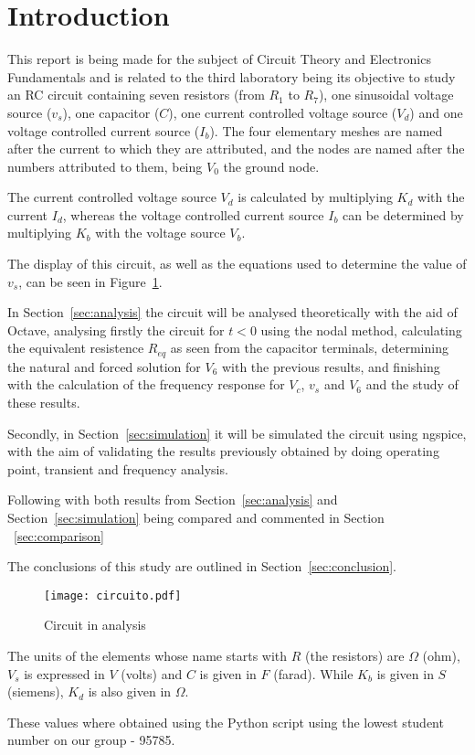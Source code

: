 \section{Introduction}
\label{sec:introduction}


\hspace{0,5cm} This report is being made for the subject of Circuit Theory and Electronics Fundamentals and is related to the third laboratory being its objective to study an RC circuit containing seven resistors (from $R_1$ to $R_7$), one sinusoidal voltage source ($v_s$), one capacitor ($C$), one current controlled voltage source ($V_d$) and one voltage controlled current source ($I_b$). The four elementary meshes are named after the current to which they are attributed, and the nodes are named after the numbers attributed to them, being $V_0$ the ground node.

The current controlled voltage source $V_d$ is calculated by multiplying $K_d$ with the current $I_d$, whereas the voltage controlled current source $I_b$ can be determined by multiplying $K_b$ with the voltage source $V_b$.

The display of this circuit, as well as the equations used to determine the value of $v_s$, can be seen in Figure~\ref{fig:circuito}.

In Section~\ref{sec:analysis} the circuit will be analysed theoretically with the aid of Octave, analysing firstly the circuit for $t<0$ using the nodal method, calculating the equivalent resistence $R_{eq}$ as seen from the capacitor terminals, determining the natural and forced solution for $V_6$ with the previous results, and finishing with the calculation of the frequency response for $V_c$, $v_s$ and $V_6$ and the study of these results.

Secondly, in Section~\ref{sec:simulation} it will be simulated the circuit using ngspice, with the aim of validating the results previously obtained by doing operating point, transient and frequency analysis.

Following with both results from Section~\ref{sec:analysis} and Section~\ref{sec:simulation} being compared and commented in Section ~\ref{sec:comparison}

The conclusions of this study are outlined in Section~\ref{sec:conclusion}.

\begin{figure}[H] \centering
\texttt{[image: circuito.pdf]}
\caption{Circuit in analysis}
\label{fig:circuito}
\end{figure}


The units of the elements whose name starts with $R$ (the resistors) are $\Omega$ (ohm), $V_s$ is expressed in $V$ (volts) and $C$ is given in $F$ (farad). While $K_b$ is given in $S$ (siemens), $K_d$ is also given in $\Omega$.

These values where obtained using the Python script using the lowest student number on our group - 95785.


